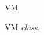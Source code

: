 \begin{figure}[H]
\centering
\begin{class}{VM}
\end{class}
\caption{VM \textit{class.}}
\label{oz_vm_class}
\end{figure}